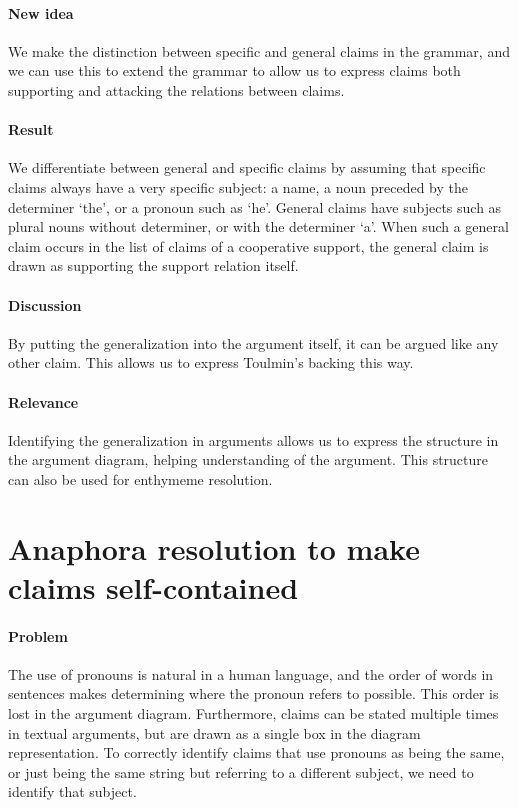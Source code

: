 \documentclass{article}
\let\stdsection\section
\renewcommand\section{\newpage\stdsection}
\begin{document}
\paragraph{New idea} We make the distinction between specific and general claims in the grammar, and we can use this to extend the grammar to allow us to express claims both supporting and attacking the relations between claims.
\paragraph{Result} We differentiate between general and specific claims by assuming that specific claims always have a very specific subject: a name, a noun preceded by the determiner `the', or a pronoun such as `he'. General claims have subjects such as plural nouns without determiner, or with the  determiner `a'. When such a general claim occurs in the list of claims of a cooperative support, the general claim is drawn as supporting the support relation itself.
\paragraph{Discussion} By putting the generalization into the argument itself, it can be argued like any other claim. This allows us to express Toulmin's backing this way.
\paragraph{Relevance} Identifying the generalization in arguments allows us to express the structure in the argument diagram, helping understanding of the argument. This structure can also be used for enthymeme resolution.

\section{Anaphora resolution to make claims self-contained}

\paragraph{Problem} The use of pronouns is natural in a human language, and the order of words in sentences makes determining where the pronoun refers to possible. This order is lost in the argument diagram. Furthermore, claims can be stated multiple times in textual arguments, but are drawn as a single box in the diagram representation. To correctly identify claims that use pronouns as being the same, or just being the same string but referring to a different subject, we need to identify that subject.
\end{document}
